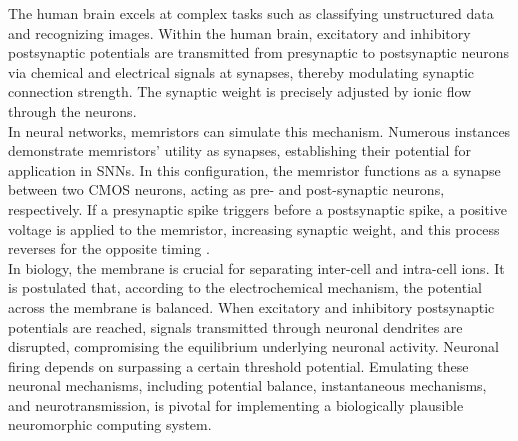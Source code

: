 The human brain excels at complex tasks such as classifying unstructured data and recognizing images. Within the human brain, excitatory and inhibitory postsynaptic potentials are transmitted from presynaptic to postsynaptic neurons via chemical and electrical signals at synapses, thereby modulating synaptic connection strength. The synaptic weight is precisely adjusted by ionic flow through the neurons. \\

\noindent In neural networks, memristors can simulate this mechanism. Numerous instances demonstrate memristors' utility as synapses, establishing their potential for application in SNNs. In this configuration, the memristor functions as a synapse between two CMOS neurons, acting as pre- and post-synaptic neurons, respectively. If a presynaptic spike triggers before a postsynaptic spike, a positive voltage is applied to the memristor, increasing synaptic weight, and this process reverses for the opposite timing \cite{chang2011short}. \\



\noindent In biology, the membrane is crucial for separating inter-cell and intra-cell ions. It is postulated that, according to the electrochemical mechanism, the potential across the membrane is balanced. When excitatory and inhibitory postsynaptic potentials are reached, signals transmitted through neuronal dendrites are disrupted, compromising the equilibrium underlying neuronal activity. Neuronal firing depends on surpassing a certain threshold potential. Emulating these neuronal mechanisms, including potential balance, instantaneous mechanisms, and neurotransmission, is pivotal for implementing a biologically plausible neuromorphic computing system.\\

